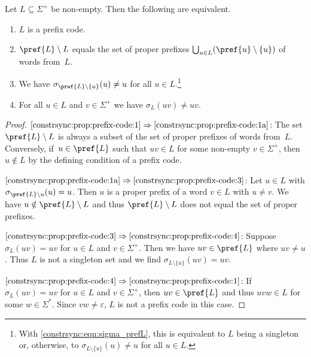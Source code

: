 \begin{proposition} \label{constrsync:prop:prefix-code}
	Let $L \subseteq \Sigma^+$ be non-empty. Then the following are equivalent.
	\begin{enumerate}
		\item \label{constrsync:prop:prefix-code:1} $L$ is a prefix code.
		
		\item \label{constrsync:prop:prefix-code:1a} $\pref{L} \setminus L$ equals the
		set of proper prefixes $\bigcup_{u \in L} ( \pref{u} \setminus \{u\} )$ of words from~$L$.
		
		\item \label{constrsync:prop:prefix-code:3} We have $\sigma_{\pref{L} \setminus \{u\}}(u) \ne u$ 
		for all $u \in L$.\footnote{With \cref{constrsync:eqn:sigma_prefL}, this is equivalent to $L$ being a singleton or, otherwise, to $\sigma_{L\setminus \{u\}}(u) \ne u$ for all $u \in L$.}
		
		\item \label{constrsync:prop:prefix-code:4} For all $u \in L$ and $v \in \Sigma^+$
		we have $\sigma_L(uv) \ne uv$.	
	\end{enumerate}
\end{proposition}
\begin{proof}
	$\ref{constrsync:prop:prefix-code:1} \Rightarrow \ref{constrsync:prop:prefix-code:1a}$:
	The set $\pref{L} \setminus L$ is always a subset of the set of proper prefixes of words from~$L$.
	Conversely, if~$u \in \pref{L}$ such that $uv \in L$ for some non-empty $v\in \Sigma^+$,
	then $u \notin L$ by the defining condition of a prefix code.	
		
	$\ref{constrsync:prop:prefix-code:1a} \Rightarrow \ref{constrsync:prop:prefix-code:3}$: 
	Let $u \in L$ with $\sigma_{\pref{L}\setminus{u}}(u) = u$.
	Then $u$ is a proper prefix of a word $v \in L$ with $u \ne v$.
	We have $u \notin \pref{L} \setminus L$
	and thus $\pref{L} \setminus L$ does not equal the set of proper prefixes.
		
	$\ref{constrsync:prop:prefix-code:3} \Rightarrow \ref{constrsync:prop:prefix-code:4}$: Suppose $\sigma_L(uv) = uv$ for $u \in L$
	and $v\in \Sigma^+$. Then we have $uv \in \pref{L}$
	where $uv \ne u$. Thus $L$ is not a singleton set 
	and we find $\sigma_{L\setminus\{u\}}(uv) = uv$.
	
	$\ref{constrsync:prop:prefix-code:4} \Rightarrow \ref{constrsync:prop:prefix-code:1}$: 
	If $\sigma_L(uv) = uv$
	for $u \in L$ and $v \in \Sigma^+$, then $uv\in \pref{L}$
	and thus $uvw \in L$ for some $w \in \Sigma^*$.
	Since $vw \ne \varepsilon$, $L$ is not a prefix code in this case.	
\end{proof}

